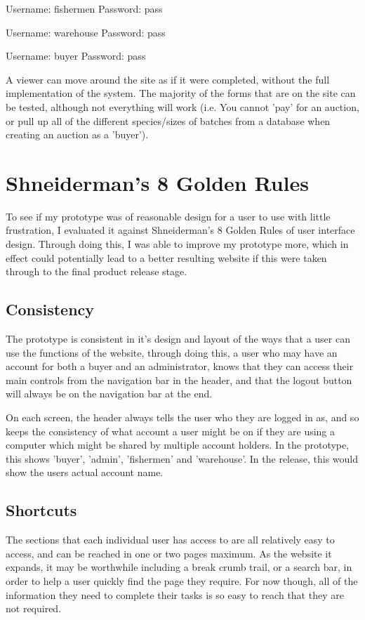 \documentclass{article}
\begin{document}
Username: fishermen
Password: pass

Username: warehouse
Password: pass

Username: buyer
Password: pass

A viewer can move around the site as if it were completed, without the full implementation of the system. The majority of the forms that are on the site can be tested, although not everything will work (i.e. You cannot 'pay' for an auction, or pull up all of the different species/sizes of batches from a database when creating an auction as a 'buyer').


\section{Shneiderman’s 8 Golden Rules}
To see if my prototype was of reasonable design for a user to use with little frustration, I evaluated it against Shneiderman's 8 Golden Rules of user interface design. Through doing this, I was able to improve my prototype more, which in effect could potentially lead to a better resulting website if this were taken through to the final product release stage.

\subsection{Consistency}
The prototype is consistent in it's design and layout of the ways that a user can use the functions of the website, through doing this, a user who may have an account for both a buyer and an administrator, knows that they can access their main controls from the navigation bar in the header, and that the logout button will always be on the navigation bar at the end.

On each screen, the header always tells the user who they are logged in as, and so keeps the consistency of what account a user might be on if they are using a computer which might be shared by multiple account holders. In the prototype, this shows 'buyer', 'admin', 'fishermen' and 'warehouse'. In the release, this would show the users actual account name.

\subsection{Shortcuts}
The sections that each individual user has access to are all relatively easy to access, and can be reached in one or two pages maximum. As the website it expands, it may be worthwhile including a break crumb trail, or a search bar, in order to help a user quickly find the page they require. For now though, all of the information they need to complete their tasks is so easy to reach that they are not required.
\end{document}
